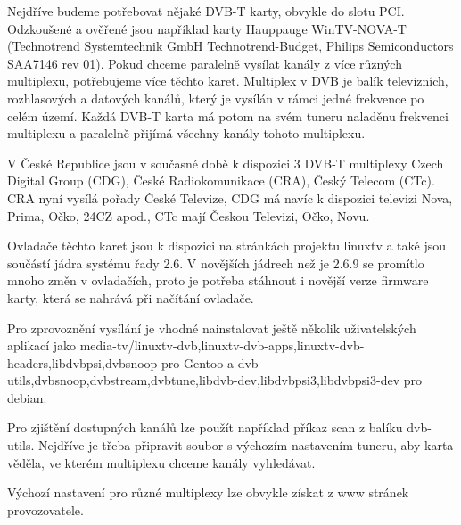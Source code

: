 \vspace{10pt}

Nejdříve budeme potřebovat nějaké DVB-T karty, obvykle do slotu PCI. Odzkoušené a ověřené jsou například karty Hauppauge WinTV-NOVA-T (Technotrend Systemtechnik GmbH Technotrend-Budget, Philips Semiconductors SAA7146 rev 01). Pokud chceme paralelně vysílat kanály z více různých multiplexu, potřebujeme více těchto karet. Multiplex v DVB je balík televizních, rozhlasových a datových kanálů, který je vysílán v rámci jedné frekvence po celém území. Každá DVB-T karta má potom na svém tuneru naladěnu frekvenci multiplexu a paralelně přijímá všechny kanály tohoto multiplexu.

\vspace{10pt}

V České Republice jsou v současné době k dispozici 3 DVB-T multiplexy Czech Digital Group (CDG), České Radiokomunikace (CRA), Český Telecom (CTc). CRA nyní vysílá pořady České Televize, CDG má navíc k dispozici televizi Nova, Prima, Očko, 24CZ apod., CTc mají Českou Televizi, Očko, Novu.

\vspace{10pt}

Ovladače těchto karet jsou k dispozici na stránkách projektu linuxtv \cite{linuxtvURL} a také jsou součástí jádra systému řady 2.6. V novějších jádrech než je 2.6.9 se promítlo mnoho změn v ovladačích, proto je potřeba stáhnout i novější verze firmware karty, která se nahrává při načítání ovladače.

\vspace{10pt}

Pro zprovoznění vysílání je vhodné nainstalovat ještě několik uživatelských aplikací jako media-tv/linuxtv-dvb,linuxtv-dvb-apps,linuxtv-dvb-headers,libdvbpsi,dvbsnoop pro Gentoo a dvb-utils,dvbsnoop,dvbstream,dvbtune,libdvb-dev,libdvbpsi3,libdvbpsi3-dev pro debian.

\vspace{10pt}

Pro zjištění dostupných kanálů lze použít například příkaz scan z balíku dvb-utils. Nejdříve je třeba připravit soubor s výchozím nastavením tuneru, aby karta věděla, ve kterém multiplexu chceme kanály vyhledávat.

\vspace{10pt}

Výchozí nastavení pro různé multiplexy lze obvykle získat z www stránek provozovatele.

\vspace{10pt}


